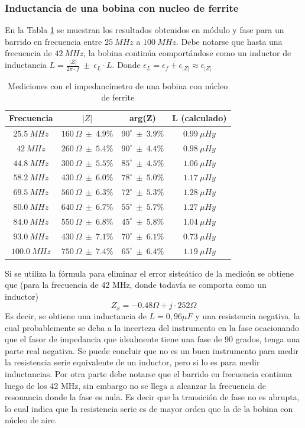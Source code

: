 \documentclass[a4paper,10pt]{article}
\begin{document}
		\subsubsection{Inductancia de una bobina con nucleo de ferrite}
		En la Tabla \ref{tabIMPbobina} se muestran los resultados obtenidos en m\'odulo y fase para un barrido en frecuencia entre $25~MHz$ a $100~MHz$. Debe notarse que hasta una frecuencia de  $42~MHz$, la bobina contin\'ua comport\'andose como un inductor de inductancia $L=\frac{\left|Z\right|}{2\pi\cdot f}~\pm~\epsilon_L\cdot L$. Donde $\epsilon_L=\epsilon_f+\epsilon_{\left|Z\right|}\approx\epsilon_{\left|Z\right|}$
		\begin{table}[!htp]
			\centering
			\begin{tabular}{|c|c|c|c|}
				\hline
				Frecuencia & $\left|Z\right|$ & arg(Z)  & L (calculado) \\
				\hline
				$25.5~MHz$ & $160~\Omega~\pm~4.9\%$ & $90^{\circ}~\pm~3.9\%$ & $0.99~\mu Hy$ \\
				\hline
				$42~MHz$ & $260~\Omega~\pm~5.4\%$ & $90^{\circ}~\pm~4.4\%$ & $0.98~\mu Hy$\\
				\hline
				$44.8~MHz$ & $300~\Omega~\pm~5.5\%$ & $85^{\circ}~\pm~4.5\%$ & $1.06~\mu Hy$ \\
				\hline
				$58.2~MHz$ & $430~\Omega~\pm~6.0\%$ & $78^{\circ}~\pm~5.0\%$ & $1.17~\mu Hy$ \\
				\hline									
				$69.5~MHz$ & $560~\Omega~\pm~6.3\%$ & $72^{\circ}~\pm~5.3\%$ & $1.28~\mu Hy$ \\
				\hline									
				$80.0~MHz$& $640~\Omega~\pm~6.7\%$ & $55^{\circ}~\pm~5.7\%$ & $1.27~\mu Hy$ \\
				\hline									
				$84.0~MHz$ & $550~\Omega~\pm~6.8\%$ & $45^{\circ}~\pm~5.8\%$ & $1.04~\mu Hy$ \\
				\hline									
				$93.0~MHz$ & $430~\Omega~\pm~7.1\%$ & $70^{\circ}~\pm~6.1\%$ & $0.73~\mu Hy$ \\
				\hline									
				$100.0~MHz$ & $750~\Omega~\pm~7.4\%$ & $65^{\circ}~\pm~6.4\%$ & $1.19~\mu Hy$ \\
				\hline			
			\end{tabular}
			\caption{Mediciones con el impedanc\'imetro de una bobina con n\'ucleo de ferrite} \label{tabIMPbobina}
		\end{table}	
		Si se utiliza la f\'ormula para eliminar el error siste\'atico de la medic\'on se obtiene que (para la frecuencia de 42 MHz, donde todav\'ia se comporta como un inductor)
		$$Z_x=-0.48\Omega+j\cdot 252\Omega$$
		Es decir, se obtiene una inductancia de $L=0,96 \mu F$ y una resistencia negativa, la cual probablemente se deba a la incerteza del instrumento en la fase ocacionando que el fasor de impedancia que idealmente tiene una fase de 90 grados, tenga una parte real negativa. Se puede concluir que no es un buen instrumento para medir la resistencia serie equivalente de un inductor, pero si lo es para medir inductancias.
		Por otra parte debe notarse que el barrido en frecuencia continua luego de los 42 MHz, sin embargo no se llega a alcanzar la frecuencia de resonancia donde la fase es nula. Es decir que la transici\'on de fase no es abrupta, lo cual indica que la resistencia serie es de mayor orden que la de la bobina con n\'ucleo de aire. 
\end{document}
